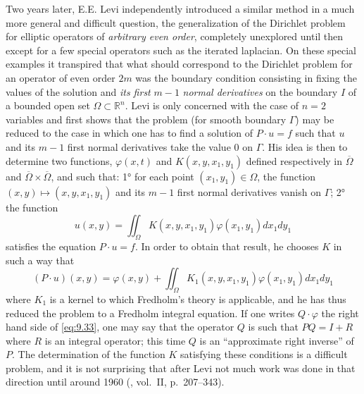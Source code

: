 \documentclass[12pt,a4paper,leqno,twoside]{extbook}
\newcommand{\R}{\mathbb{R}}
\begin{document}
Two years later, E.E. Levi independently introduced a similar method in a much more general and difficult question, the generalization of the Dirichlet problem for elliptic operators of \emph{arbitrary even order}, completely unexplored until then except for a few special operators such as the iterated laplacian. On these special examples it transpired that what should correspond to the Dirichlet problem for an operator of even order \(2m\) was the boundary condition consisting in fixing the values of the solution and \emph{its first} \(m-1\) \emph{normal derivatives} on the boundary \(I\) of a bounded open set \(\Omega \subset \R^n\). Levi is only concerned with the case of \(n = 2\) variables and first shows that the problem (for smooth boundary \(\Gamma\)) may be reduced to the case in which one has to find a solution of \(P \cdot u = f\) such that \(u\) and its \(m-1\) first normal derivatives take the value 0 on \(\Gamma\). His idea is then to determine two functions, \(\varphi(x,t)\) and \(K(x,y,x_1,y_1)\) defined respectively in \(\overline{\Omega}\) and \(\overline{\Omega} \times \overline{\Omega}\), and such that: 1° for each point \((x_1, y_1) \in \Omega\), the function \((x,y) \mapsto (x,y,x_1,y_1)\) and its \(m-1\) first normal derivatives vanish on \(\Gamma\); 2° the function
\begin{equation}
    \label{eq:9.33}
    u(x,y) = \iint_\Omega K(x,y,x_1,y_1)\varphi(x_1,y_1) dx_1 dy_1
\end{equation}
satisfies the equation \(P \cdot u = f\). In order to obtain that result, he chooses \(K\) in such a way that
\begin{equation}
    \label{eq:9.34}
    (P \cdot u)(x,y) = \varphi(x,y) + \iint_\Omega K_1(x,y,x_1,y_1)\varphi(x_1,y_1) dx_1 dy_1
\end{equation}
where \(K_1\) is a kernel to which Fredholm's theory is applicable, and he has thus reduced the problem to a Fredholm integral equation. If one writes \(Q \cdot \varphi\) the right hand side of \eqref{eq:9.33}, one may say that the operator \(Q\) is such that \(PQ = I + R\) where \(R\) is an integral operator; this time \(Q\) is an ``approximate right inverse'' of \(P\). The determination of the function \(K\) satisfying these conditions is a difficult problem, and it is not surprising that after Levi not much work was done in that direction until around 1960 (\cite{145}, vol.~II, p.~207--343).
\end{document}
